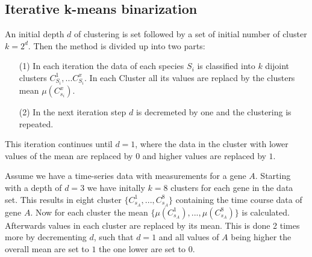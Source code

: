 \subsection*{Iterative k-means binarization}

An initial depth $d$ of clustering is set followed by a set of initial number of cluster $k=2^d$. Then the method is divided up into two parts:

\begin{itemize}
\item[(1)] In each iteration the data of each species $S_{i}$  is classified into $k$ dijoint clusters $ C_{S{_i}}^{1},...C_{S{_i}}^{x}$. In each Cluster all its values are replacd by the clusters mean $\mu(C_{s_{i}}^{x})$.
\item[(2)]  In the next iteration step $d$ is decremeted by one and the clustering is repeated.
\end{itemize}

This iteration continues until $d=1$, where the data in the cluster with lower values of the mean are replaced by $0$ and higher values are replaced by $1$.



\begin{exmp}Assume we have a time-series data with measurements for a gene $A$. Starting with a depth of $d=3$ we have initally $k=8$ clusters for each gene in the data set. This results in eight cluster $\{C_{s{_A}}^{1},...,C_{s{_A}}^{8}\}$ containing the time course data of gene $A$. Now for each cluster the mean $\{\mu(C_{s_{A}}^{1}),...,\mu(C_{s_{A}}^{8})\}$ is calculated. Afterwards values in each cluster are replaced by its mean. This is done 2 times more by decrementing $d$, such that $d=1$ and all values of $A$ being higher the overall mean are set to $1$ the one lower are set to $0$. \end{exmp}



\newpage
